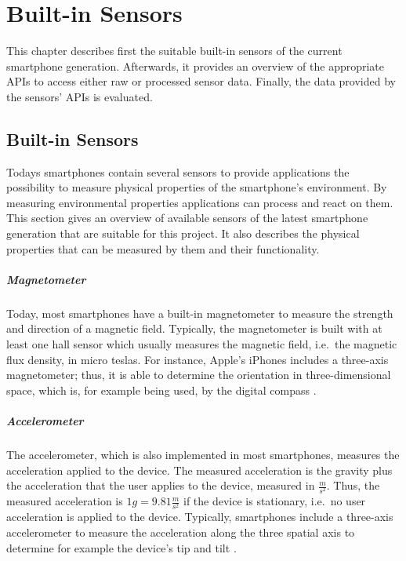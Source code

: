 \chapter{Built-in Sensors} \label{chap:sensors}

This chapter describes first the suitable built-in sensors of the current smartphone generation. Afterwards, it provides an overview of the appropriate \acsp{API} to access either raw or processed sensor data. Finally, the data provided by the sensors' \acsp{API} is evaluated.


\section{Built-in Sensors}
Todays smartphones contain several sensors to provide applications the possibility to measure physical properties of the smartphone's environment. By measuring environmental properties applications can process and react on them. This section gives an overview of available sensors of the latest smartphone generation that are suitable for this project. It also describes the physical properties that can be measured by them and their functionality.


\paragraph{Magnetometer}
Today, most smartphones have a built-in magnetometer to measure the strength and direction of a magnetic field. Typically, the magnetometer is built with at least one hall sensor which usually measures the magnetic field, i.e.\ the magnetic flux density, in micro teslas. For instance, Apple's iPhones includes a three-axis magnetometer; thus, it is able to determine the orientation in three-dimensional space, which is, for example being used, by the digital compass \citep{apple:wwdc_2012_pham,apple:ios_doc_cm}.


\paragraph{Accelerometer}
The accelerometer, which is also implemented in most smartphones, measures the acceleration applied to the device. The measured acceleration is the gravity plus the acceleration that the user applies to the device, measured in $\frac{m}{s^2}$. Thus, the measured acceleration is $1g = 9.81 \frac{m}{s^2}$ if the device is stationary, i.e.\ no user acceleration is applied to the device. Typically, smartphones include a three-axis accelerometer to measure the acceleration along the three spatial axis to determine for example the device's tip and tilt \citep{apple:wwdc_2012_pham,apple:ios_doc_cm}.


